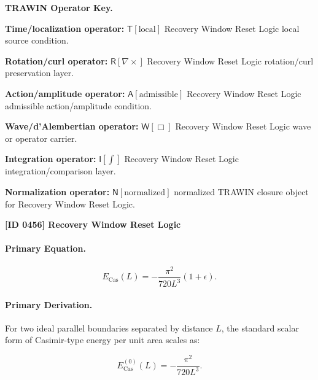 \par\vspace{0.45\baselineskip}
\noindent\begin{minipage}[t]{\linewidth}
\begingroup
\small
\raggedright
\textbf{TRAWIN Operator Key.}\par
\noindent\textbf{Time/localization operator:} $\mathsf{T}\!\left[\mathrm{local}\right]$ Recovery Window Reset Logic local source condition.\par
\noindent\textbf{Rotation/curl operator:} $\mathsf{R}\!\left[\nabla\times\right]$ Recovery Window Reset Logic rotation/curl preservation layer.\par
\noindent\textbf{Action/amplitude operator:} $\mathsf{A}\!\left[\mathrm{admissible}\right]$ Recovery Window Reset Logic admissible action/amplitude condition.\par
\noindent\textbf{Wave/d'Alembertian operator:} $\mathsf{W}\!\left[\Box\right]$ Recovery Window Reset Logic wave or operator carrier.\par
\noindent\textbf{Integration operator:} $\mathsf{I}\!\left[\int\right]$ Recovery Window Reset Logic integration/comparison layer.\par
\noindent\textbf{Normalization operator:} $\mathsf{N}\!\left[\mathrm{normalized}\right]$ normalized TRAWIN closure object for Recovery Window Reset Logic.\par
\endgroup
\end{minipage}

\clearpage
\noindent\textbf{[ID 0456] Recovery Window Reset Logic}\par
\vspace{0.35em}
\begingroup\small
\paragraph{Primary Equation.}
\begin{equation}
E_{\mathrm{Cas}}(L)
=
-\frac{\pi^2}{720L^3}(1+\epsilon).
\end{equation}

\paragraph{Primary Derivation.}
For two ideal parallel boundaries separated by distance $L$, the standard scalar form of Casimir-type energy per unit area scales as:

\begin{equation}
E_{\mathrm{Cas}}^{(0)}(L)
=
-\frac{\pi^2}{720L^3}.
\end{equation}

